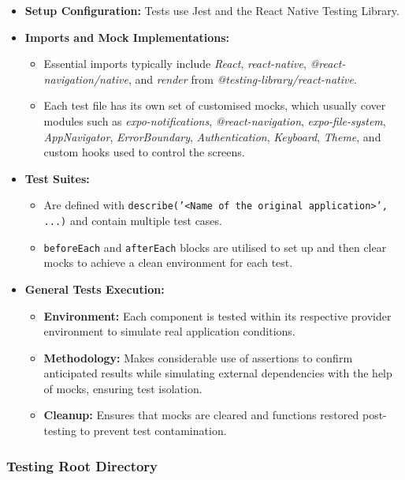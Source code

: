 \begin{itemize}
    \item \textbf{Setup Configuration:} Tests use Jest and the React Native Testing Library.
    \item \textbf{Imports and Mock Implementations:}
    \begin{itemize}
        \item Essential imports typically include \textit{React}, \textit{react-native}, \textit{@react-navigation/native}, and \textit{render} from \textit{@testing-library/react-native}.
        \item Each test file has its own set of customised mocks, which usually cover modules such as \textit{expo-notifications}, \textit{@react-navigation}, \textit{expo-file-system}, \textit{AppNavigator}, \textit{ErrorBoundary}, \textit{Authentication}, \textit{Keyboard}, \textit{Theme}, and custom hooks used to control the screens.
    \end{itemize}
    \item \textbf{Test Suites:}
    \begin{itemize}
        \item Are defined with \texttt{describe('<Name of the original application>', ...)} and contain multiple test cases.
        \item \texttt{beforeEach} and \texttt{afterEach} blocks are utilised to set up and then clear mocks to achieve a clean environment for each test.
    \end{itemize}
    \item \textbf{General Tests Execution:}
    \begin{itemize}
        \item \textbf{Environment:} Each component is tested within its respective provider environment to simulate real application conditions.
        \item \textbf{Methodology:} Makes considerable use of assertions to confirm anticipated results while simulating external dependencies with the help of mocks, ensuring test isolation.
        \item \textbf{Cleanup:} Ensures that mocks are cleared and functions restored post-testing to prevent test contamination.
    \end{itemize}
\end{itemize}

\subsubsection{Testing Root Directory}

